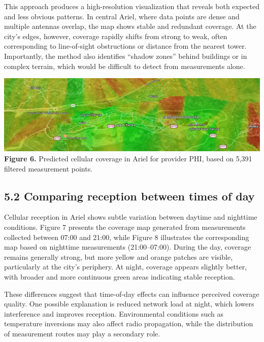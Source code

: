 \documentclass[11pt]{article}
\begin{document}
This approach produces a high-resolution visualization that reveals both
expected and less obvious patterns. In central Ariel, where data points
are dense and multiple antennas overlap, the map shows stable and
redundant coverage. At the city's edges, however, coverage rapidly
shifts from strong to weak, often corresponding to line-of-sight
obstructions or distance from the nearest tower. Importantly, the method
also identifies ``shadow zones'' behind buildings or in complex terrain,
which would be difficult to detect from measurements alone.

\includegraphics[width=1.0\textwidth]{figures/media/image6.png}\\
\textbf{Figure 6.} Predicted cellular coverage in Ariel for provider
PHI, based on 5,391 filtered measurement points.

\hypertarget{comparing-reception-between-times-of-day}{%
\subsection{5.2 Comparing reception between times of
day}\label{comparing-reception-between-times-of-day}}

Cellular reception in Ariel shows subtle variation between daytime and
nighttime conditions. Figure 7 presents the coverage map generated from
measurements collected between 07:00 and 21:00, while Figure 8
illustrates the corresponding map based on nighttime measurements
(21:00--07:00). During the day, coverage remains generally strong, but
more yellow and orange patches are visible, particularly at the city's
periphery. At night, coverage appears slightly better, with broader and
more continuous green areas indicating stable reception.

These differences suggest that time-of-day effects can influence
perceived coverage quality. One possible explanation is reduced network
load at night, which lowers interference and improves reception.
Environmental conditions such as temperature inversions may also affect
radio propagation, while the distribution of measurement routes may play
a secondary role.
\end{document}
